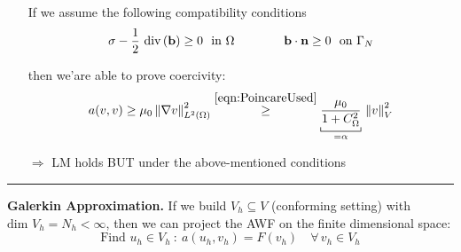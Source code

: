 \begin{enumerate}[label=\textit{(\roman*)}]
If we assume the following compatibility conditions
\begin{equation*}
\sigma- \frac{1}{2}\,\operatorname{div}{(\mathbf{b})}\geq 0\ \text{ in }\Omega\qquad\qquad \mathbf{b}\cdot \mathbf{n} \geq 0\ \text{ on }\Gamma_N
\end{equation*}

then we'are able to prove coercivity:
\begin{equation*}
a(v,v)\geq \mu_0 \norm{\nabla v}_{L^2(\Omega)}^2 \overset{\eqref{eqn:PoincareUsed}}{\geq} \underbracket[0.5pt]{\frac{\mu_0}{1+C_\Omega^2}}_{=\alpha}\,\norm{v}_V^2 
\end{equation*}

\item[$\Longrightarrow$] LM holds BUT under the above-mentioned conditions
\end{enumerate}

\rule{0.47\textwidth}{0.2pt}

\smallskip

\textbf{Galerkin Approximation.} If we build $V_h\subseteq V$ (conforming setting) with $\text{dim }V_h=N_h<\infty$, then we can project the AWF on the finite dimensional space:
\begin{equation*}
\boxed{\text{Find } u_h\in V_h\ :\ a(u_h,v_h)=F(v_h)\quad\forall\, v_h\in V_h}\tag{G}
\end{equation*}

\newcolumn

